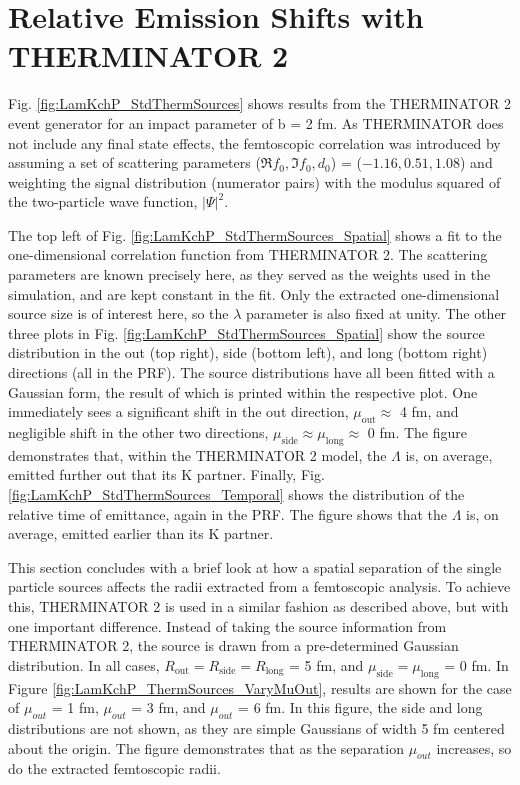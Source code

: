 \documentclass[ALICE,manyauthors]{cernphprep}
\newcommand{\Lam}{$\Lambda$\xspace}
\begin{document}
\section{Relative Emission Shifts with THERMINATOR 2}
\label{App:THERM}

Fig. \ref{fig:LamKchP_StdThermSources} shows results from the THERMINATOR 2 event generator for an impact parameter of b = 2 fm.
As THERMINATOR does not include any final state effects, the femtoscopic correlation was introduced by assuming a set of scattering parameters ($\Re f_{0}, \Im f_{0}, d_{0}$) = ($-1.16, 0.51, 1.08$) and weighting the signal distribution (numerator pairs) with the modulus squared of the two-particle wave function, $|\Psi|^{2}$.

The top left of Fig. \ref{fig:LamKchP_StdThermSources_Spatial} shows a fit to the one-dimensional correlation function from THERMINATOR 2.
The scattering parameters are known precisely here, as they served as the weights used in the simulation, and are kept constant in the fit.
Only the extracted one-dimensional source size is of interest here, so the $\lambda$ parameter is also fixed at unity.
The other three plots in Fig. \ref{fig:LamKchP_StdThermSources_Spatial} show the source distribution in the out (top right), side (bottom left), and long (bottom right) directions (all in the PRF).
The source distributions have all been fitted with a Gaussian form, the result of which is printed within the respective plot.
One immediately sees a significant shift in the out direction, $\mu_{\mathrm{out}} \approx$ 4 fm, and negligible shift in the other two directions, $\mu_{\mathrm{side}} \approx \mu_{\mathrm{long}} \approx$ 0 fm.
The figure demonstrates that, within the THERMINATOR 2 model, the \Lam is, on average, emitted further out that its K partner.
Finally, Fig. \ref{fig:LamKchP_StdThermSources_Temporal} shows the distribution of the relative time of emittance, again in the PRF.
The figure shows that the \Lam is, on average, emitted earlier than its K partner. 

This section concludes with a brief look at how a spatial separation of the single particle sources affects the radii extracted from a femtoscopic analysis.
To achieve this, THERMINATOR 2 is used in a similar fashion as described above, but with one important difference.
Instead of taking the source information from THERMINATOR 2, the source is drawn from a pre-determined Gaussian distribution.
In all cases, $R_{\mathrm{out}} = R_{\mathrm{side}} = R_{\mathrm{long}}$ = 5 fm, and $\mu_{\mathrm{side}} = \mu_{\mathrm{long}}$ = 0 fm.
In Figure \ref{fig:LamKchP_ThermSources_VaryMuOut}, results are shown for the case of $\mu_{out}$ = 1 fm, $\mu_{out}$ = 3 fm, and $\mu_{out}$ = 6 fm.
In this figure, the side and long distributions are not shown, as they are simple Gaussians of width 5 fm centered about the origin.
The figure demonstrates that as the separation $\mu_{out}$ increases, so do the extracted femtoscopic radii.
\end{document}
